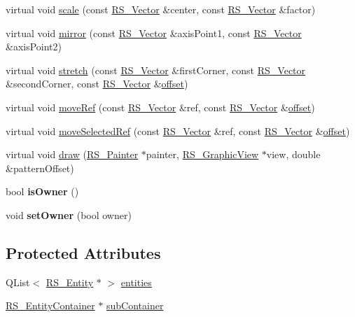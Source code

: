 \begin{DoxyCompactItemize}
\item 
virtual void \hyperlink{classRS__EntityContainer_a8912550cbf78c7f3521e079d66c0617f}{scale} (const \hyperlink{classRS__Vector}{R\-S\-\_\-\-Vector} \&center, const \hyperlink{classRS__Vector}{R\-S\-\_\-\-Vector} \&factor)
\item 
virtual void \hyperlink{classRS__EntityContainer_a6715f6871daaf6b2ba12581bcfbdcb5d}{mirror} (const \hyperlink{classRS__Vector}{R\-S\-\_\-\-Vector} \&axis\-Point1, const \hyperlink{classRS__Vector}{R\-S\-\_\-\-Vector} \&axis\-Point2)
\item 
virtual void \hyperlink{classRS__EntityContainer_a8e4dd5e12871bd33fbb1d77f9c9135af}{stretch} (const \hyperlink{classRS__Vector}{R\-S\-\_\-\-Vector} \&first\-Corner, const \hyperlink{classRS__Vector}{R\-S\-\_\-\-Vector} \&second\-Corner, const \hyperlink{classRS__Vector}{R\-S\-\_\-\-Vector} \&\hyperlink{classRS__Entity_aa296d21b9aac99161d386ce2f60f0fea}{offset})
\item 
virtual void \hyperlink{classRS__EntityContainer_a339f673caeaa50e85505f2aaa34f2dda}{move\-Ref} (const \hyperlink{classRS__Vector}{R\-S\-\_\-\-Vector} \&ref, const \hyperlink{classRS__Vector}{R\-S\-\_\-\-Vector} \&\hyperlink{classRS__Entity_aa296d21b9aac99161d386ce2f60f0fea}{offset})
\item 
virtual void \hyperlink{classRS__EntityContainer_a5767391756aecd7f0d583d3d08b07022}{move\-Selected\-Ref} (const \hyperlink{classRS__Vector}{R\-S\-\_\-\-Vector} \&ref, const \hyperlink{classRS__Vector}{R\-S\-\_\-\-Vector} \&\hyperlink{classRS__Entity_aa296d21b9aac99161d386ce2f60f0fea}{offset})
\item 
virtual void \hyperlink{classRS__EntityContainer_a38dad976bacc4b40db0c2d791d0b9958}{draw} (\hyperlink{classRS__Painter}{R\-S\-\_\-\-Painter} $\ast$painter, \hyperlink{classRS__GraphicView}{R\-S\-\_\-\-Graphic\-View} $\ast$view, double \&pattern\-Offset)
\item 
\hypertarget{classRS__EntityContainer_ab29723fcee3216325387cef49897f4d0}{bool {\bfseries is\-Owner} ()}\label{classRS__EntityContainer_ab29723fcee3216325387cef49897f4d0}

\item 
\hypertarget{classRS__EntityContainer_ac1a858ba6664c569552214a1ba014e11}{void {\bfseries set\-Owner} (bool owner)}\label{classRS__EntityContainer_ac1a858ba6664c569552214a1ba014e11}

\end{DoxyCompactItemize}
\subsection*{Protected Attributes}
\begin{DoxyCompactItemize}
\item 
Q\-List$<$ \hyperlink{classRS__Entity}{R\-S\-\_\-\-Entity} $\ast$ $>$ \hyperlink{classRS__EntityContainer_a0713c529148635cf924054410ac0f945}{entities}
\item 
\hyperlink{classRS__EntityContainer}{R\-S\-\_\-\-Entity\-Container} $\ast$ \hyperlink{classRS__EntityContainer_a6c8f22f2d0e9d363bfebefd924e352f0}{sub\-Container}
\end{DoxyCompactItemize}
